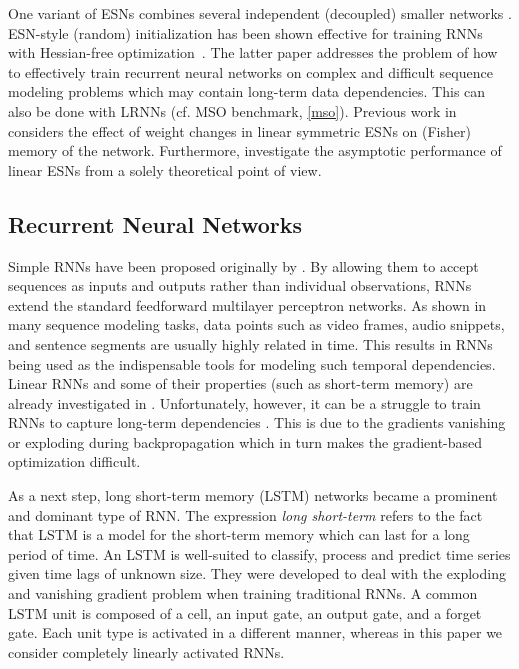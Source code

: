 \documentclass{sn-jnl}
\theoremstyle{definition}
\begin{document}
One variant of ESNs combines several independent (decoupled) smaller networks
\citep{XYH07}. ESN-style (random) initialization has been shown
effective for training RNNs with Hessian-free optimization~\citep{MS11}. The
latter paper addresses the problem of how to effectively train recurrent neural
networks on complex and difficult sequence modeling problems which may contain
long-term data dependencies. This can also be done with LRNNs (cf. MSO
benchmark, \cref{mso}).
Previous work in \citep{Tin18} considers the effect of weight changes in linear symmetric ESNs on
(Fisher) memory of the network. Furthermore, \citet{CW+16} investigate the
asymptotic performance of linear ESNs from a solely theoretical point of view.

\subsection{Recurrent Neural Networks}

Simple RNNs have been proposed originally by \citet{Elm90}. By allowing them to accept sequences
as inputs and outputs rather than individual observations, RNNs extend the
standard feedforward multilayer perceptron networks. As shown in many sequence
modeling tasks, data points such as video frames, audio snippets, and sentence
segments are usually highly related in time. This results in RNNs being used as
the indispensable tools for modeling such temporal dependencies. Linear RNNs and
some of their properties (such as short-term memory) are already investigated in
\citep{WLS94}. Unfortunately, however, it can be a struggle to train RNNs to
capture long-term dependencies \citep{BSF94,PMB13}. This is due to the
gradients vanishing or exploding during backpropagation which in turn makes the
gradient-based optimization difficult.

As a next step,  long short-term memory (LSTM) networks \citep{HS97} became 
a prominent and dominant type of RNN. The expression \emph{long
short-term} refers to the fact that LSTM is a model for the short-term memory
which can last for a long period of time. An LSTM is well-suited to classify,
process and predict time series given time lags of unknown size. They were
developed to deal with the exploding and vanishing gradient problem when
training traditional RNNs. A common LSTM unit is composed of a cell,
an input gate, an output gate, and a forget gate. Each unit type is activated in
a different manner, whereas in this paper we consider completely linearly
activated RNNs.
\end{document}

